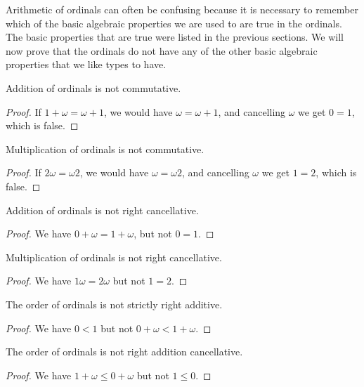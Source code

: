 \documentclass[../../math.tex]{subfiles}
\begin{document}
Arithmetic of ordinals can often be confusing because it is necessary to
remember which of the basic algebraic properties we are used to are true in the
ordinals.  The basic properties that are true were listed in the previous
sections.  We will now prove that the ordinals do not have any of the other
basic algebraic properties that we like types to have.

\begin{theorem}
    Addition of ordinals is not commutative.
\end{theorem}
\begin{proof}
    If $1 + \omega = \omega + 1$, we would have $\omega = \omega + 1$, and
    cancelling $\omega$ we get $0 = 1$, which is false.
\end{proof}

\begin{theorem}
    Multiplication of ordinals is not commutative.
\end{theorem}
\begin{proof}
    If $2 \omega = \omega 2$, we would have $\omega = \omega 2$, and
    cancelling $\omega$ we get $1 = 2$, which is false.
\end{proof}

\begin{theorem}
    Addition of ordinals is not right cancellative.
\end{theorem}
\begin{proof}
    We have $0 + \omega = 1 + \omega$, but not $0 = 1$.
\end{proof}

\begin{theorem}
    Multiplication of ordinals is not right cancellative.
\end{theorem}
\begin{proof}
    We have $1\omega = 2\omega$ but not $1 = 2$.
\end{proof}

\begin{theorem}
    The order of ordinals is not strictly right additive.
\end{theorem}
\begin{proof}
    We have $0 < 1$ but not $0 + \omega < 1 + \omega$.
\end{proof}

\begin{theorem}
    The order of ordinals is not right addition cancellative.
\end{theorem}
\begin{proof}
    We have $1 + \omega \leq 0 + \omega$ but not $1 \leq 0$.
\end{proof}
\end{document}

